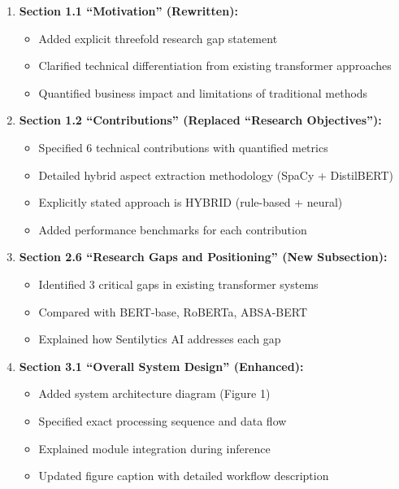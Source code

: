 \documentclass[11pt,a4paper]{article}
\begin{document}
\begin{enumerate}[leftmargin=*]
    \item \textbf{Section 1.1 ``Motivation'' (Rewritten):}
    \begin{itemize}
        \item Added explicit threefold research gap statement
        \item Clarified technical differentiation from existing transformer approaches
        \item Quantified business impact and limitations of traditional methods
    \end{itemize}
    
    \item \textbf{Section 1.2 ``Contributions'' (Replaced ``Research Objectives''):}
    \begin{itemize}
        \item Specified 6 technical contributions with quantified metrics
        \item Detailed hybrid aspect extraction methodology (SpaCy + DistilBERT)
        \item Explicitly stated approach is HYBRID (rule-based + neural)
        \item Added performance benchmarks for each contribution
    \end{itemize}
    
    \item \textbf{Section 2.6 ``Research Gaps and Positioning'' (New Subsection):}
    \begin{itemize}
        \item Identified 3 critical gaps in existing transformer systems
        \item Compared with BERT-base, RoBERTa, ABSA-BERT
        \item Explained how Sentilytics AI addresses each gap
    \end{itemize}
    
    \item \textbf{Section 3.1 ``Overall System Design'' (Enhanced):}
    \begin{itemize}
        \item Added system architecture diagram (Figure 1)
        \item Specified exact processing sequence and data flow
        \item Explained module integration during inference
        \item Updated figure caption with detailed workflow description
    \end{itemize}
    

\end{enumerate}
\end{document}
